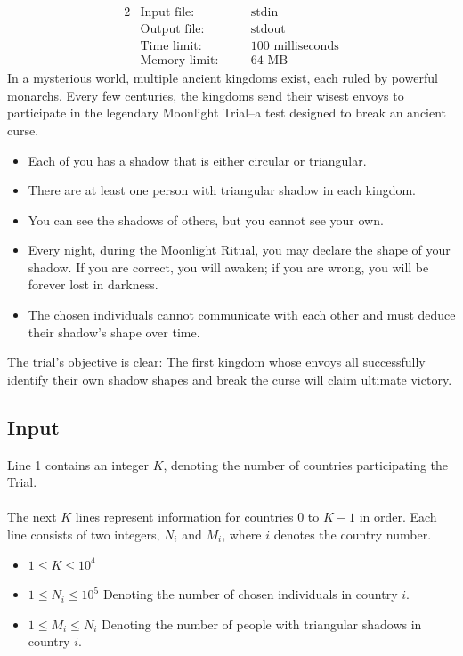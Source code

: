 \documentclass[12pt,a4paper]{article}
\begin{document}
\begin{alignat*} {2}
 &   \text{Input file:}   \quad     &&\text{stdin}\\
 &   \text{Output file:}  \quad     &&\text{stdout}\\
 &   \text{Time limit:}   \quad     &&\text{100 milliseconds}\\
 &   \text{Memory limit:} \quad     &&\text{64 MB}
\end{alignat*}
\noindent
In a mysterious world, multiple ancient kingdoms exist, each ruled by powerful monarchs. Every few centuries, the kingdoms send their wisest envoys to participate in the legendary Moonlight Trial--a test designed to break an ancient curse.
\begin{itemize}
    \item Each of you has a shadow that is either circular or triangular.
    \item There are at least one person with triangular shadow in each kingdom.
    \item You can see the shadows of others, but you cannot see your own.
    \item Every night, during the Moonlight Ritual, you may declare the shape of your shadow. If you are correct, you will awaken; if you are wrong, you will be forever lost in darkness.
    \item The chosen individuals cannot communicate with each other and must deduce their shadow's shape over time.  
\end{itemize}
\noindent
The trial's objective is clear:
The first kingdom whose envoys all successfully identify their own shadow shapes and break the curse will claim ultimate victory.

\subsection*{\fontsize{16}{12}Input}
Line 1 contains an integer $K$, denoting the number of countries participating the Trial.
\\\\
\noindent
The next \(K\) lines represent information for countries \(0\) to \(K-1\) in order. Each line consists of two integers, \(N_i\) and \(M_i\), where \(i\) denotes the country number.
\begin{itemize}
    \item $1 \leq K \leq 10^4$
    \item $1 \leq N_i \leq 10^5$ Denoting the number of chosen individuals in country \(i\).
    \item $1 \leq M_i \leq N_i$ Denoting the number of people with triangular shadows in country \(i\).
\end{itemize}
\end{document}
